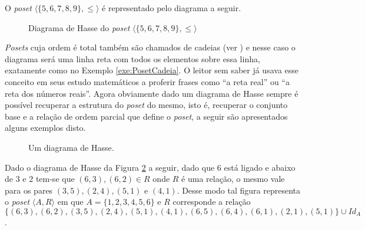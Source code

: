 \begin{exemplo}\label{exe:PosetCadeia}
	O \textit{poset} $\langle \{5, 6, 7, 8, 9\}, \leq \rangle$ é representado pelo diagrama a seguir.
\end{exemplo}
	
\begin{figure}[h]
  \centering
  \caption{Diagrama de Hasse do \textit{poset} $\langle \{5, 6, 7, 8, 9\}, \leq \rangle$}
  \label{fig:DiagramaHasse4}
\end{figure}

\textit{Posets} cuja ordem é total também são chamados de cadeias (ver \cite{abe1991-TC, morgado1962poset}) e nesse caso o diagrama será uma linha reta com todos os elementos sobre essa linha, exatamente como no Exemplo \ref{exe:PosetCadeia}. O leitor sem saber já usava esse conceito em seus estudo matemáticos a proferir frases como ``a reta real'' ou ``a reta dos números reais''. Agora obviamente dado um diagrama de Hasse sempre é possível recuperar a estrutura do \textit{poset} do mesmo, isto é, recuperar o conjunto base e a relação de ordem parcial que define o \textit{poset}, a seguir são apresentados alguns exemplos disto.

\begin{figure}[h]
  \centering
  \caption{Um diagrama de Hasse.}
  \label{fig:DiagramaHasse5}
\end{figure}

\begin{exemplo}
  Dado o diagrama de Hasse da Figura \ref{fig:DiagramaHasse5} a seguir,  dado que $6$ está ligado e abaixo de $3$ e $2$ tem-se que $(6,3), (6, 2) \in R$ onde $R$ é uma relação, o mesmo vale para os pares $(3, 5), (2, 4), (5, 1)$  e $(4, 1)$. Desse modo tal figura representa o \textit{poset} $\langle A, R \rangle$ em que $A = \{1, 2, 3, 4, 5, 6\}$ e $R$ corresponde a relação $\{(6,3), (6, 2), (3, 5), (2, 4), (5, 1), (4, 1), (6, 5), (6, 4), (6, 1), (2, 1), (5, 1)\} \cup Id_A$.
\end{exemplo}


